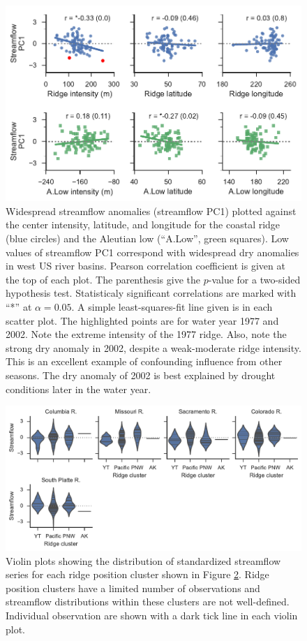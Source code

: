 \documentclass[final, double]{ua-thesis}
\begin{document}
\begin{figure}[ht]
 \centerline{\includegraphics[width=39pc]{p2figures/fig_feature_pc1_scatter.pdf}}
  \caption{Widespread streamflow anomalies (streamflow PC1) plotted against the center intensity, latitude, and longitude for the coastal ridge (blue circles) and the Aleutian low (``A.Low'', green squares). Low values of streamflow PC1 correspond with widespread dry anomalies in west US river basins. Pearson correlation coefficient is given at the top of each plot. The parenthesis give the $p$-value for a two-sided hypothesis test. Statisticaly significant correlations are marked with ``*'' at $\alpha = 0.05$. A simple least-squares-fit line given is in each scatter plot. The highlighted points are for water year 1977 and 2002. Note the extreme intensity of the 1977 ridge. Also, note the strong dry anomaly in 2002, despite a weak-moderate ridge intensity. This is an excellent example of confounding influence from other seasons. The dry anomaly of 2002 is best explained by drought conditions later in the water year.}\label{fig_feature_pc1_scatter}
\end{figure}

\begin{figure}[ht]
 \centerline{\includegraphics[width=39pc]{p2figures/fig_streamflow_ridgecluster_violins.pdf}}
  \caption{Violin plots showing the distribution of standardized streamflow series for each ridge position cluster shown in Figure \ref{fig_streamflow_ridgecluster_violins}. Ridge position clusters have a limited number of observations and streamflow distributions within these clusters are not well-defined. Individual observation are shown with a dark tick line in each violin plot. }\label{fig_streamflow_ridgecluster_violins}
\end{figure}
\end{document}
